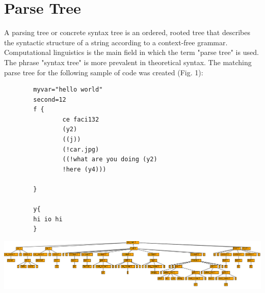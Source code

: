 \section{Parse Tree}
A parsing tree or concrete syntax tree is an ordered, rooted tree that describes the syntactic structure of a string according to a context-free grammar. Computational linguistics is the main field in which the term "parse tree" is used. 
The phrase "syntax tree" is more prevalent in theoretical syntax. The matching parse tree for the following sample of code was created (Fig. 1):

\begin{verbatim}
        myvar="hello world"
        second=12
        f {
                ce faci132
                (y2)
                ((j))
                (!car.jpg)
                ((!what are you doing (y2)
                !here (y4)))
            
        }
        
        y{
        hi io hi
        }     
\end{verbatim}

{ \centering \includegraphics[width=\textwidth]{images/parsetree.png} }


